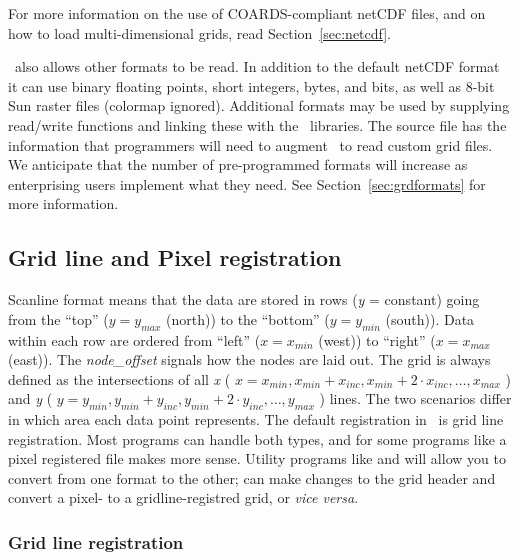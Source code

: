 For more information on the use of COARDS-compliant netCDF files, and on how to load
multi-dimensional grids, read Section~\ref{sec:netcdf}.

\GMT\ also allows other formats to be read.  In addition to
the default netCDF format it can use binary floating points, short
integers, bytes, and bits, as well as 8-bit Sun raster files (colormap
ignored).   Additional formats may be used by supplying read/write
functions and linking these with the \GMT\ libraries.
The source file  has the information that
programmers will need to augment \GMT\ to read custom grid files.  We
anticipate that the number of pre-programmed formats will increase as
enterprising users implement what they need.  See Section~\ref{sec:grdformats}
for more information.


\subsection{Grid line and Pixel registration} 

Scanline format means that the data are stored in rows (\emph{y} = constant)
going from the ``top'' ($y = y_{max}$ (north)) to the ``bottom''
($y = y_{min}$ (south)).  Data within each row are ordered from
``left'' ($x = x_{min}$ (west)) to ``right'' ($x = x_{max}$
(east)).  The \emph{node\_offset} signals how the nodes are laid out.
The grid is always defined as the intersections of all \emph{x}
( \( x = x_{min}, x_{min} + x_{inc}, x_{min} + 2 \cdot x_{inc}, \ldots, x_{max} \) )
and \emph{y} ( \( y = y_{min}, y_{min} + y_{inc}, y_{min} + 2 \cdot y_{inc}, \ldots, y_{max} \) )
lines.  The two scenarios differ in which area each data point
represents.
The default registration in \GMT\ is grid line registration.  Most
programs can handle both types, and for some programs like 
a pixel registered file makes more sense.  Utility programs like
 and  will allow you to convert
from one format to the other;  can make changes to the grid header
and convert a pixel- to a gridline-registred grid, or \emph{vice versa}.

\subsubsection{Grid line registration}

